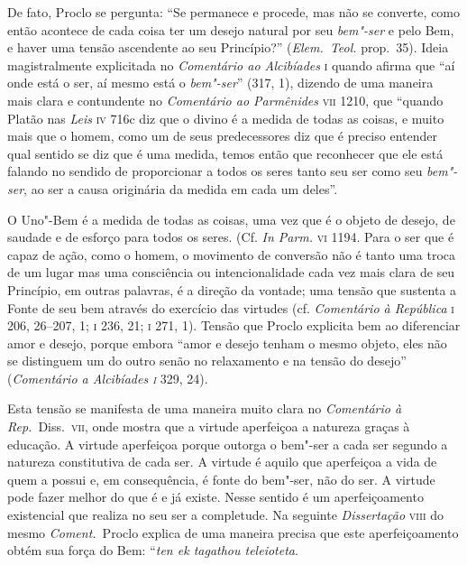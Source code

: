 De fato, Proclo se pergunta: ``Se permanece e procede, mas não se
converte, como então acontece de cada coisa ter um desejo natural por seu 
\textit{bem"-ser} e pelo Bem, e haver uma tensão ascendente ao seu Princípio?'' 
(\textit{Elem.~Teol.} prop.~35). Ideia magistralmente explicitada no
\textit{Comentário ao Alcibíades} \textsc{i} quando afirma que ``aí onde está o
ser, aí mesmo está o \textit{bem"-ser}'' (317, 1), dizendo de uma maneira mais clara
e contundente no \textit{Comentário ao Parmênides} \textsc{vii} 1210, 
que ``quando Platão nas \textit{Leis} \textsc{iv} 716c diz que o divino é a
medida de todas as coisas, e muito mais que o homem, como um de seus
predecessores diz que é preciso entender qual sentido se diz que é uma medida, 
temos então que reconhecer que ele está falando no sendido de proporcionar a
todos os seres tanto seu ser como seu \textit{bem"-ser}, ao ser a causa
originária da medida em cada um deles''.

O Uno"-Bem é a medida de todas as coisas, uma vez que é o objeto de desejo, de
saudade e de esforço para todos os seres. (Cf. \textit{In Parm.} \textsc{vi
1194}.
Para o ser que é capaz de ação, como o homem, o movimento de conversão não é
tanto uma troca de um lugar mas uma consciência ou intencionalidade cada vez
mais clara de seu Princípio, em outras palavras, é a direção da vontade; uma
tensão que sustenta a Fonte de seu bem através do exercício das virtudes (cf.
\textit{Comentário à República} \textsc{i} 206, 26--207, 1; \textsc{i} 236, 21; \textsc{i} 271, 1). Tensão
que Proclo explicita bem ao diferenciar amor e desejo, porque embora 
``amor e desejo tenham o mesmo objeto, eles não se distinguem um do outro senão
no relaxamento e na tensão do desejo'' (\textit{Comentário a Alcibíades
\textsc{i}} 329, 24).

Esta tensão se manifesta de uma maneira muito clara no \textit{Comentário à
Rep.}~Diss.~\textsc{vii}, onde mostra que a virtude aperfeiçoa a natureza graças
à educação. A virtude aperfeiçoa porque outorga o bem"-ser a cada ser segundo a
natureza constitutiva de cada ser. A virtude é aquilo que aperfeiçoa a vida de
quem a possui e, em consequência, é fonte do bem"-ser, não do ser. A virtude pode
fazer melhor do que é e já existe. Nesse sentido é um aperfeiçoamento
existencial que realiza no seu ser a completude. Na seguinte
\textit{Dissertação} \textsc{viii} do mesmo \textit{Coment.}~Proclo explica de
uma maneira precisa que este aperfeiçoamento obtém sua força do Bem:
``\textit{ten ek tagathou teleioteta}.

